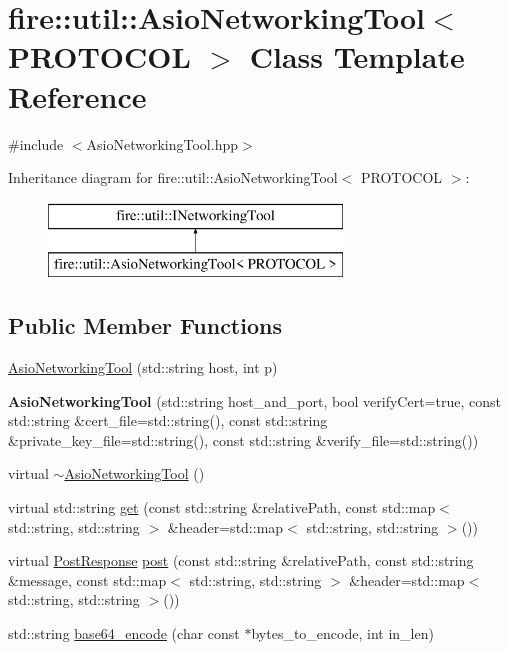 \hypertarget{a01968}{}\section{fire\+:\+:util\+:\+:Asio\+Networking\+Tool$<$ P\+R\+O\+T\+O\+C\+OL $>$ Class Template Reference}
\label{a01968}


{\ttfamily \#include $<$Asio\+Networking\+Tool.\+hpp$>$}

Inheritance diagram for fire\+:\+:util\+:\+:Asio\+Networking\+Tool$<$ P\+R\+O\+T\+O\+C\+OL $>$\+:\begin{figure}[H]
\begin{center}
\leavevmode
\includegraphics[height=2.000000cm]{a01968}
\end{center}
\end{figure}
\subsection*{Public Member Functions}
\begin{DoxyCompactItemize}
\item 
\hyperlink{a01968_a5edd72ce9937e052a82e7564500b3861}{Asio\+Networking\+Tool} (std\+::string host, int p)
\item 
\mbox{\label{a01968_a5826de4a9e051ec854ad7be3a48ac86d}} 
{\bfseries Asio\+Networking\+Tool} (std\+::string host\+\_\+and\+\_\+port, bool verify\+Cert=true, const std\+::string \&cert\+\_\+file=std\+::string(), const std\+::string \&private\+\_\+key\+\_\+file=std\+::string(), const std\+::string \&verify\+\_\+file=std\+::string())
\item 
virtual \hyperlink{a01968_afc51c728e1bd136b6729ac892df490ab}{$\sim$\+Asio\+Networking\+Tool} ()
\item 
virtual std\+::string \hyperlink{a01968_a40fed691e6b520a8e0f55734466896ca}{get} (const std\+::string \&relative\+Path, const std\+::map$<$ std\+::string, std\+::string $>$ \&header=std\+::map$<$ std\+::string, std\+::string $>$())
\item 
virtual \hyperlink{a01972}{Post\+Response} \hyperlink{a01968_a930b5535c0c68f54d01d4de36cc854a0}{post} (const std\+::string \&relative\+Path, const std\+::string \&message, const std\+::map$<$ std\+::string, std\+::string $>$ \&header=std\+::map$<$ std\+::string, std\+::string $>$())
\item 
std\+::string \hyperlink{a01968_a93d3f6e729eb9980102770f922ca7af4}{base64\+\_\+encode} (char const $\ast$bytes\+\_\+to\+\_\+encode, int in\+\_\+len)
\end{DoxyCompactItemize}
